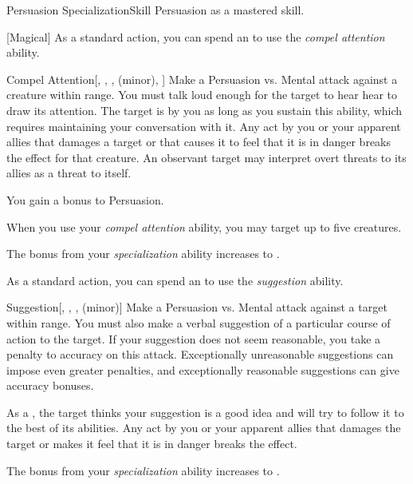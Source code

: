     \begin{feat}{Persuasion Specialization}{Skill}
        \featpre Persuasion as a mastered skill.

        [Magical] As a standard action, you can spend an  to use the \textit{compel attention} ability.
        \begin{ability}{Compel Attention}[, , ,  (minor), ]
            Make a Persuasion vs. Mental attack against a creature within \rngmed range.
            You must talk loud enough for the target to hear hear to draw its attention.
            \hit The target is  by you as long as you sustain this ability, which requires maintaining your conversation with it.
            Any act by you or your apparent allies that damages a target or that causes it to feel that it is in danger breaks the effect for that creature.
            An observant target may interpret overt threats to its allies as a threat to itself.
        \end{ability}

         You gain a  bonus to Persuasion.

         When you use your \textit{compel attention} ability, you may target up to five creatures.

         The bonus from your \textit{specialization} ability increases to .

         As a standard action, you can spend an  to use the \textit{suggestion} ability.
        \begin{ability}{Suggestion}[, , ,  (minor)]
            Make a Persuasion vs. Mental attack against a target within \rngmed range.
            You must also make a verbal suggestion of a particular course of action to the target.
            If your suggestion does not seem reasonable, you take a  penalty to accuracy on this attack.
            Exceptionally unreasonable suggestions can impose even greater penalties, and exceptionally reasonable suggestions can give accuracy bonuses.

            \hit As a , the target thinks your suggestion is a good idea and will try to follow it to the best of its abilities.
            Any act by you or your apparent allies that damages the target or makes it feel that it is in danger breaks the effect.

        \end{ability}

         The bonus from your \textit{specialization} ability increases to .
    \end{feat}

